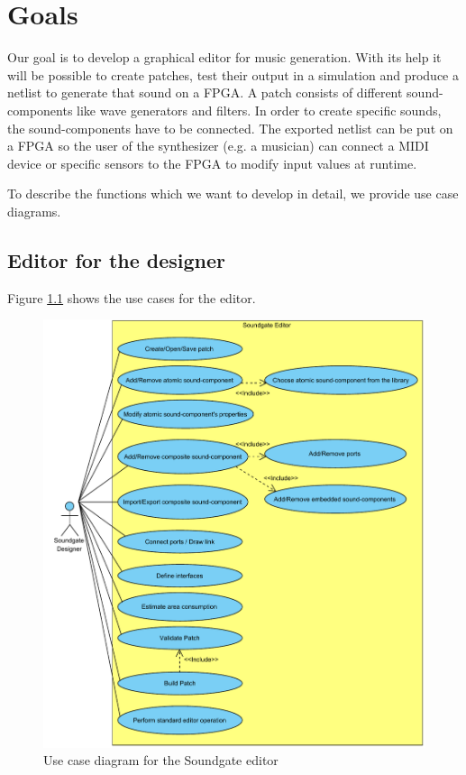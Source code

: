\chapter{Goals}
\label{chapter:Goals}
Our goal is to develop a graphical editor for music generation. With its help it will be possible to create patches, test their output in a simulation and produce a netlist to generate that sound on a \ac{FPGA}. A patch consists of different sound-components like wave generators and filters. In order to create specific sounds, the sound-components have to be connected. The exported netlist can be put on a \ac{FPGA} so the user of the synthesizer (e.g. a musician) can connect a MIDI device or specific sensors to the \ac{FPGA} to modify input values at runtime.

To describe the functions which we want to develop in detail, we provide use case diagrams.

\section{Editor for the designer}
\label{editor}
Figure \ref{fig:Soundgate_Designer} shows the use cases for the editor.

	\begin{figure}[!h]
		\centering
			\includegraphics[width=1\textwidth]{images/Soundgate_Designer.pdf}
		\caption{Use case diagram for the Soundgate editor}
		\label{fig:Soundgate_Designer}
	\end{figure}

